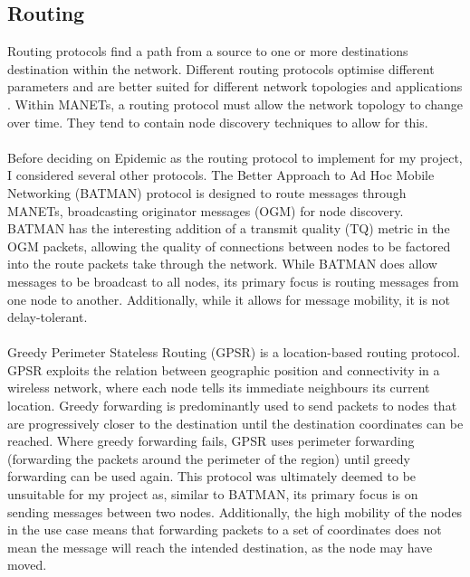 \documentclass[12pt,a4paper]{report}
\begin{document}
\subsection{Routing}
Routing protocols find a path from a source to one or more destinations destination within the network. Different routing protocols optimise different parameters and are better suited for different network topologies and applications \cite{princom}. Within MANETs, a routing protocol must allow the network topology to change over time. They tend to contain node discovery techniques to allow for this. \\ \\
Before deciding on Epidemic as the routing protocol to implement for my project, I considered several other protocols. The Better Approach to Ad Hoc Mobile Networking (BATMAN) protocol \cite{batman} is designed to route messages through MANETs, broadcasting originator messages (OGM) for node discovery. BATMAN has the interesting addition of a transmit quality (TQ) metric in the OGM packets, allowing the quality of connections between nodes to be factored into the route packets take through the network. While BATMAN does allow messages to be broadcast to all nodes, its primary focus is routing messages from one node to another. Additionally, while it allows for message mobility, it is not delay-tolerant.\\ \\
Greedy Perimeter Stateless Routing (GPSR) \cite{gpsr} is a location-based routing protocol. GPSR exploits the relation between geographic position and connectivity in a wireless network, where each node tells its immediate neighbours its current location. Greedy forwarding is predominantly used to send packets to nodes that are progressively closer to the destination until the destination coordinates can be reached. Where greedy forwarding fails, GPSR uses perimeter forwarding (forwarding the packets around the perimeter of the region) until greedy forwarding can be used again. This protocol was ultimately deemed to be unsuitable for my project as, similar to BATMAN, its primary focus is on sending messages between two nodes. Additionally, the high mobility of the nodes in the use case means that forwarding packets to a set of coordinates does not mean the message will reach the intended destination, as the node may have moved.
\end{document}
